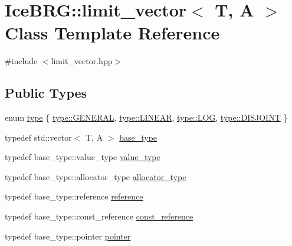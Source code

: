 \hypertarget{classIceBRG_1_1limit__vector}{}\section{Ice\+B\+R\+G\+:\+:limit\+\_\+vector$<$ T, A $>$ Class Template Reference}
\label{classIceBRG_1_1limit__vector}


{\ttfamily \#include $<$limit\+\_\+vector.\+hpp$>$}

\subsection*{Public Types}
\begin{DoxyCompactItemize}
\item 
enum \hyperlink{classIceBRG_1_1limit__vector_a67ad5ccda3b716a3aca2fa6223e75681}{type} \{ \hyperlink{classIceBRG_1_1limit__vector_a67ad5ccda3b716a3aca2fa6223e75681ab61773b9b3968a9988d765d728985862}{type\+::\+G\+E\+N\+E\+R\+A\+L}, 
\hyperlink{classIceBRG_1_1limit__vector_a67ad5ccda3b716a3aca2fa6223e75681aaac544aacc3615aada24897a215f5046}{type\+::\+L\+I\+N\+E\+A\+R}, 
\hyperlink{classIceBRG_1_1limit__vector_a67ad5ccda3b716a3aca2fa6223e75681a4b5ffcdaf38ce4d463171f5c977c5ab3}{type\+::\+L\+O\+G}, 
\hyperlink{classIceBRG_1_1limit__vector_a67ad5ccda3b716a3aca2fa6223e75681a63548de92aab6aa127df46cfbed9e23f}{type\+::\+D\+I\+S\+J\+O\+I\+N\+T}
 \}
\item 
typedef std\+::vector$<$ T, A $>$ \hyperlink{classIceBRG_1_1limit__vector_a8f5c1d622276ed2d9835feab9538b96e}{base\+\_\+type}
\item 
typedef base\+\_\+type\+::value\+\_\+type \hyperlink{classIceBRG_1_1limit__vector_a9b1e2f022c18b0227b25bb571741bb28}{value\+\_\+type}
\item 
typedef base\+\_\+type\+::allocator\+\_\+type \hyperlink{classIceBRG_1_1limit__vector_ac75a579f04baed676ee916b0ad3dfec0}{allocator\+\_\+type}
\item 
typedef base\+\_\+type\+::reference \hyperlink{classIceBRG_1_1limit__vector_af3acb98a381ba86ca927f099591d1512}{reference}
\item 
typedef base\+\_\+type\+::const\+\_\+reference \hyperlink{classIceBRG_1_1limit__vector_aed6fc504d7987040be16d150089c7893}{const\+\_\+reference}
\item 
typedef base\+\_\+type\+::pointer \hyperlink{classIceBRG_1_1limit__vector_a87f3142bb69e755ba61e51ddfa7e6eae}{pointer}
\item 

\end{DoxyCompactItemize}
